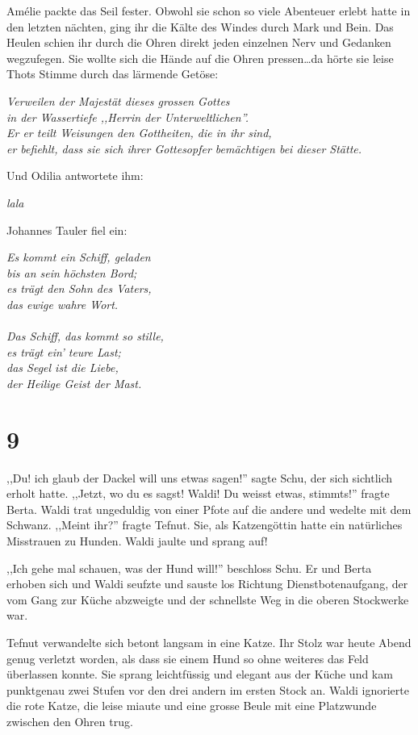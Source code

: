 Amélie packte das Seil fester. Obwohl sie schon so viele Abenteuer erlebt hatte in den letzten nächten, ging ihr die Kälte des Windes durch Mark und Bein. Das Heulen schien ihr durch die Ohren direkt jeden einzelnen Nerv und Gedanken wegzufegen. Sie wollte sich die Hände auf die Ohren pressen\dots da hörte sie leise Thots Stimme durch das lärmende Getöse:

\textit{Verweilen der Majestät dieses grossen Gottes\\
in der Wassertiefe ,,Herrin der Unterweltlichen''.\\
Er er teilt Weisungen den Gottheiten, die in ihr sind,\\
er befiehlt, dass sie sich ihrer Gottesopfer bemächtigen bei dieser Stätte.}

Und Odilia antwortete ihm:

\textit{lala}

Johannes Tauler fiel ein:

\textit{Es kommt ein Schiff, geladen\\
bis an sein höchsten Bord;\\
es trägt den Sohn des Vaters,\\
das ewige wahre Wort.\\
\\
Das Schiff, das kommt so stille,\\
es trägt ein' teure Last;\\
das Segel ist die Liebe,\\
der Heilige Geist der Mast.}



\section*{9}

,,Du! ich glaub der Dackel will uns etwas sagen!'' sagte Schu, der sich sichtlich erholt hatte. ,,Jetzt, wo du es sagst! Waldi! Du weisst etwas, stimmts!'' fragte Berta. Waldi trat ungeduldig von einer Pfote auf die andere und wedelte mit dem Schwanz. ,,Meint ihr?'' fragte Tefnut. Sie, als Katzengöttin hatte ein natürliches Misstrauen zu Hunden. Waldi jaulte und sprang auf!

,,Ich gehe mal schauen, was der Hund will!'' beschloss Schu. Er und Berta erhoben sich und Waldi seufzte und sauste los Richtung Dienstbotenaufgang, der vom Gang zur Küche abzweigte und der schnellste Weg in die oberen Stockwerke war.

Tefnut verwandelte sich betont langsam in eine Katze. Ihr Stolz war heute Abend genug verletzt worden, als dass sie einem Hund so ohne weiteres das Feld überlassen konnte. Sie sprang leichtfüssig und elegant aus der Küche und kam punktgenau zwei Stufen vor den drei andern im ersten Stock an. Waldi ignorierte die rote Katze, die leise miaute und eine grosse Beule mit eine Platzwunde zwischen den Ohren trug.

